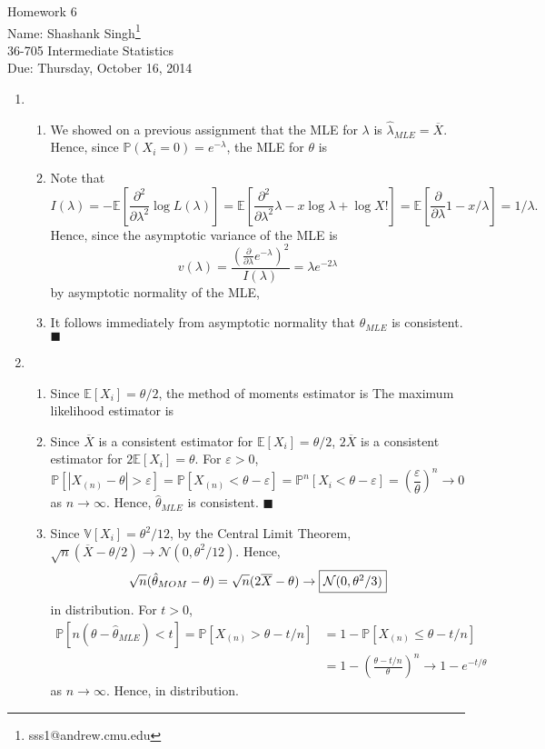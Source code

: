\documentclass[11pt]{article}
\makeatletter
\newcommand{\myname}{Shashank Singh\footnote{sss1@andrew.cmu.edu}}
\newcommand{\myclass}{36-705 Intermediate Statistics}
\newcommand{\myhwnum}{6}
\newcommand{\duedate}{Thursday, October 16, 2014}
\renewcommand{\qed}{\quad \ensuremath{\blacksquare}}
\newcommand{\E}{\mathbb{E}} %
\newcommand{\Var}{\mathbb{V}} %
\newcommand{\e}{\varepsilon} %
\renewcommand{\P}{\mathbb{P}}   %
\newcommand{\ol}{\overline}
\makeatother
\begin{document}
\thispagestyle{plain}

{\Large Homework \myhwnum} \\
Name: \myname \\
\myclass \\
Due: \duedate

\begin{enumerate}
\item
\begin{enumerate}
\item We showed on a previous assignment that the MLE for $\lambda$ is
$\hat\lambda_{MLE} = \ol X$. Hence, since $\P(X_i = 0) = e^{-\lambda}$, the MLE
for $\theta$ is \fbox{$\hat \theta_{MLE} = e^{-\ol X}$.}
\item Note that
\[I(\lambda)
    = -\E\left[ \frac{\partial^2}{\partial\lambda^2} \log L(\lambda) \right]
    = \E\left[ \frac{\partial^2}{\partial\lambda^2} \lambda - x\log\lambda + \log X! \right]
    = \E\left[ \frac{\partial}{\partial\lambda} 1 - x/\lambda \right]
    = 1/\lambda.
\]
Hence, since the asymptotic variance of the MLE is
\[v(\lambda)
    = \frac{\left( \frac{\partial}{\partial \lambda} e^{-\lambda} \right)^2}
           {I(\lambda)}
    = \lambda e^{-2\lambda}
\]
by asymptotic normality of the MLE,
\item It follows immediately from asymptotic normality that $\hat\theta_{MLE}$
is consistent. \qed
\end{enumerate}

\item
\begin{enumerate}
\item Since $\E[X_i] = \theta/2$, the method of moments estimator is
\fbox{$\hat\theta_{MOM} = 2\ol X$.} The maximum likelihood estimator is
\item Since $\ol X$ is a consistent estimator for $\E[X_i] = \theta/2$,
$2\ol X$ is a consistent estimator for $2\E[X_i] = \theta$. For $\e > 0$,
\[\P[|X_{(n)} - \theta| > \e]
    = \P[X_{(n)} < \theta - \e]
    = \P^n[X_i < \theta - \e]
    = \left( \frac{\e}{\theta} \right)^n
    \to 0
\]
as $n \to \infty$. Hence, $\hat\theta_{MLE}$ is consistent. \qed

\item Since $\Var[X_i] = \theta^2/12$, by the Central Limit Theorem,
$\sqrt{n}(\ol X - \theta/2) \to \mathcal{N}(0,\theta^2/12)$. Hence,
\[\sqrt{n}(\hat\theta_{MOM} - \theta)
    = \sqrt{n}(2\ol X - \theta)
    \to \mbox{\fbox{$\mathcal{N}(0,\theta^2/3)$}}\]
in distribution.
For $t > 0$,
\begin{align*}
\P[n(\theta - \hat\theta_{MLE}) < t]
    = \P[X_{(n)} > \theta - t/n]
 &  = 1 - \P[X_{(n)} \leq \theta - t/n] \\
 &  = 1 - \left( \frac{\theta - t/n}{\theta} \right)^n
    \to 1 - e^{-t/\theta}
\end{align*}
as $n \to \infty$. Hence,
 in distribution.


\end{enumerate}
\end{enumerate}
\end{document}
